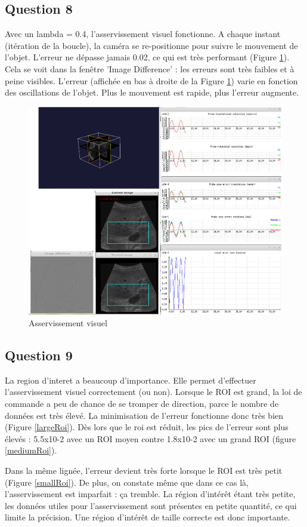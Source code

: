 \documentclass[a4paper,11pt]{article}
\begin{document}
\subsection{Question 8}
Avec un lambda = 0.4, l'asservissement visuel fonctionne. A chaque instant (it\'eration de la boucle), la cam\'era se re-positionne pour suivre le mouvement de l'objet. L'erreur ne d\'epasse jamais 0.02, ce qui est tr\`es performant (Figure \ref{assertVisu}). Cela se voit dans la fen\^etre 'Image Difference' : les erreurs sont tr\`es faibles et \`a peine visibles. L'erreur (affich\'ee en bas \`a droite de la Figure \ref{assertVisu}) varie en fonction des oscillations de l'objet. Plus le mouvement est rapide, plus l'erreur augmente.
\begin{figure}[H]
    \centering
    \includegraphics[width=1.0\textwidth]{./images/q8.png}
    \caption{Asservissement visuel}
    \label{assertVisu}
\end{figure}


\subsection{Question 9}
La region d'interet a beaucoup d'importance. Elle permet d'effectuer l'asservissement visuel correctement (ou non). Lorsque le ROI est grand, la loi de commande a peu de chance de se tromper de direction, parce le nombre de donn\'ees est tr\`es \'elev\'e. La minimisation de l'erreur fonctionne donc tr\`es bien (Figure \ref{largeRoi}). D\`es lors que le roi est r\'eduit, les pics de l'erreur sont plus \'elev\'es : 5.5x10-2 avec un ROI moyen contre 1.8x10-2 avec un grand ROI (figure \ref{mediumRoi}).
\par
Dans la m\^eme lign\'ee, l'erreur devient tr\`es forte lorsque le ROI est tr\`es petit (Figure \ref{smallRoi}). De plus, on constate m\^eme que dans ce cas l\`a, l'asservissement est imparfait : ça tremble. La r\'egion d'int\'er\^et \'etant tr\`es petite, les donn\'ees utiles pour l'asservissement sont pr\'esentes en petite quantit\'e, ce qui limite la pr\'ecision. Une r\'egion d'int\'er\^et de taille correcte est donc importante.
\end{document}
